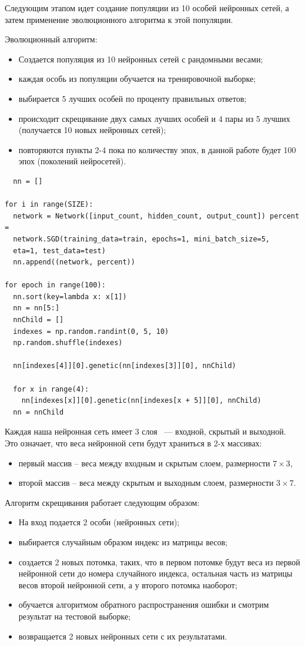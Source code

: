 Следующим этапом идет создание популяции из 10 особей нейронных сетей, а затем применение эволюционного алгоритма к этой популяции.

Эволюционный алгоритм:
\begin{itemize}
  \item Создается популяция из 10 нейронных сетей с рандомными весами;
  \item каждая особь из популяции обучается на тренировочной выборке;
  \item выбирается 5 лучших особей по проценту правильных ответов;
  \item происходит скрещивание двух самых лучших особей и 4 пары из 5 лучших (получается 10 новых нейронных сетей);
  \item повторяются пункты 2-4 пока по количеству эпох, в данной работе будет 100 эпох (поколений нейросетей).
\end{itemize}

\begin{lstlisting}
  nn = []

for i in range(SIZE):
  network = Network([input_count, hidden_count, output_count]) percent =
  network.SGD(training_data=train, epochs=1, mini_batch_size=5,
  eta=1, test_data=test)
  nn.append((network, percent))

for epoch in range(100):
  nn.sort(key=lambda x: x[1])
  nn = nn[5:] 
  nnChild = []
  indexes = np.random.randint(0, 5, 10)
  np.random.shuffle(indexes) 
 
  nn[indexes[4]][0].genetic(nn[indexes[3]][0], nnChild) 

  for x in range(4):
    nn[indexes[x]][0].genetic(nn[indexes[x + 5]][0], nnChild)
  nn = nnChild
\end{lstlisting}

Каждая наша нейронная сеть имеет 3 слоя ~--- входной, скрытый и выходной. Это означает, что веса нейронной сети будут храниться в 2-х массивах:

\begin{itemize}
  \item первый массив – веса между входным и скрытым слоем, размерности $7\times3$,
  \item второй массив – веса между скрытым и выходным слоем, размерности $3\times7$.
\end{itemize}

Алгоритм скрещивания работает следующим образом:

\begin{itemize}
  \item На вход подается 2 особи (нейронных сети);
  \item выбирается случайным образом индекс из матрицы весов;
  \item создается 2 новых потомка, таких, что в первом потомке будут веса из первой нейронной сети до номера случайного индекса, остальная часть из матрицы весов второй нейронной сети, а у второго потомка наоборот;
  \item обучается алгоритмом обратного распространения ошибки и смотрим результат на тестовой выборке;
  \item возвращается 2 новых нейронных сети с их результатами.
\end{itemize}

